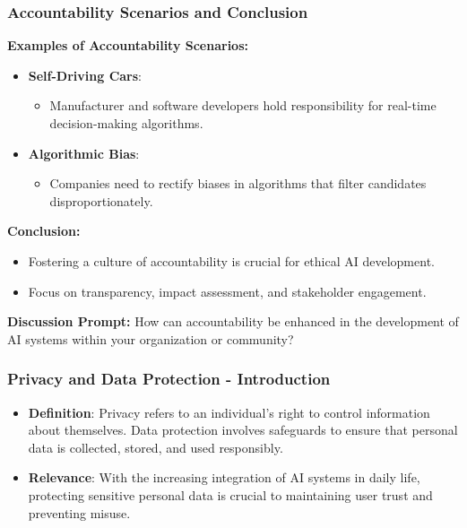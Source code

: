 \documentclass{beamer}
\begin{document}
\begin{frame}[fragile]
    \frametitle{Accountability Scenarios and Conclusion}
    \textbf{Examples of Accountability Scenarios:}
    \begin{itemize}
        \item \textbf{Self-Driving Cars}:
            \begin{itemize}
                \item Manufacturer and software developers hold responsibility for real-time decision-making algorithms.
            \end{itemize}

        \item \textbf{Algorithmic Bias}:
            \begin{itemize}
                \item Companies need to rectify biases in algorithms that filter candidates disproportionately.
            \end{itemize}
    \end{itemize}

    \textbf{Conclusion:}
    \begin{itemize}
        \item Fostering a culture of accountability is crucial for ethical AI development.
        \item Focus on transparency, impact assessment, and stakeholder engagement.
    \end{itemize}

    \textbf{Discussion Prompt:}
    How can accountability be enhanced in the development of AI systems within your organization or community?
\end{frame}

\begin{frame}[fragile]
    \frametitle{Privacy and Data Protection - Introduction}
    \begin{itemize}
        \item \textbf{Definition}: 
        Privacy refers to an individual's right to control information about themselves. 
        Data protection involves safeguards to ensure that personal data is collected, stored, and used responsibly.
        
        \item \textbf{Relevance}: 
        With the increasing integration of AI systems in daily life, protecting sensitive personal data is crucial to maintaining user trust and preventing misuse.
    \end{itemize}
\end{frame}
\end{document}
